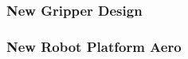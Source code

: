 \documentclass{standalone}
\begin{document}
\subsubsection{New Gripper Design}


\subsubsection{New Robot Platform Aero}

\end{document}
